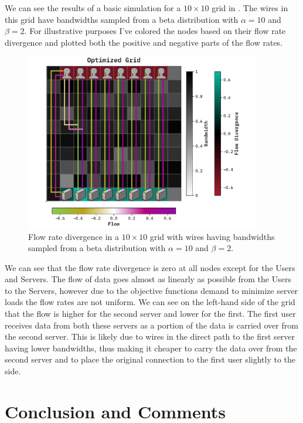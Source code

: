 \documentclass[10pt, titlepage, a4paper]{article}
\begin{document}
We can see the results of a basic simulation for a $10\times 10$ grid in \textcolor{red}{}. The wires 
in this grid have bandwidths sampled from a beta distribution with $\alpha = 10$ and $\beta = 2$. For illustrative purposes
I've colored the nodes based on their flow rate divergence and plotted both the positive and negative parts of the 
flow rates.

\begin{figure}[H]
    \centering
    \includegraphics[width=0.92\textwidth]{../Images/optimize-case-10.pdf}
    \caption{Flow rate divergence in a $10\times 10$ grid with wires having bandwidths sampled from a beta distribution with $\alpha = 10$ and $\beta = 2$.}
    \label{fig:basic_grid}
\end{figure}

We can see that the flow rate divergence is zero at all nodes except for the Users and Servers. The flow of data goes almost 
as linearly as possible from the Users to the Servers, however due to the objective functions demand to minimize server loads 
the flow rates are not uniform. We can see on the left-hand side of the grid that the flow is higher for the second server and lower 
for the first. The first user receives data from both these servers as a portion of the data is carried over from the second 
server. This is likely due to wires in the direct path to the first server having lower bandwidths, thus making it cheaper 
to carry the data over from the second server and to place the original connection to the first user slightly to the side.


\section{Conclusion and Comments}

% 
% 

\end{document}
